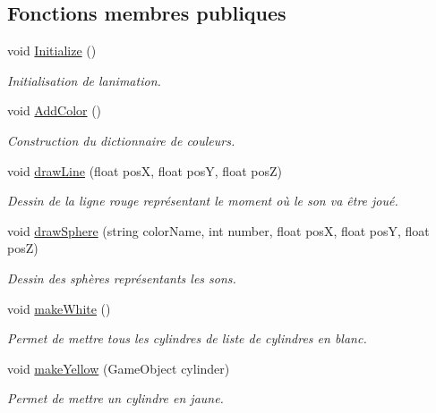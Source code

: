 \subsection*{Fonctions membres publiques}
\begin{DoxyCompactItemize}
\item 
void \hyperlink{class_animation_ac57910012abaeb65ca0e626445eaefad}{Initialize} ()
\begin{DoxyCompactList}\small\item\em Initialisation de l\textquotesingle{}animation. \end{DoxyCompactList}\item 
void \hyperlink{class_animation_af22bd17e3ce0fa033af55bb9c6dd0d58}{Add\+Color} ()
\begin{DoxyCompactList}\small\item\em Construction du dictionnaire de couleurs. \end{DoxyCompactList}\item 
void \hyperlink{class_animation_a1dadb53b8ccec186d964a0450e78b47a}{draw\+Line} (float pos\+X, float pos\+Y, float pos\+Z)
\begin{DoxyCompactList}\small\item\em Dessin de la ligne rouge représentant le moment où le son va être joué. \end{DoxyCompactList}\item 
void \hyperlink{class_animation_a06d09825eeb89a1d53eff4a38b3ec6a7}{draw\+Sphere} (string color\+Name, int number, float pos\+X, float pos\+Y, float pos\+Z)
\begin{DoxyCompactList}\small\item\em Dessin des sphères représentants les sons. \end{DoxyCompactList}\item 
void \hyperlink{class_animation_a266bf2fda2038d9972419317aec73638}{make\+White} ()
\begin{DoxyCompactList}\small\item\em Permet de mettre tous les cylindres de liste de cylindres en blanc. \end{DoxyCompactList}\item 
void \hyperlink{class_animation_acf024d79e89180c5487b9059b2623ab5}{make\+Yellow} (Game\+Object cylinder)
\begin{DoxyCompactList}\small\item\em Permet de mettre un cylindre en jaune. \end{DoxyCompactList}\item 

\end{DoxyCompactItemize}
